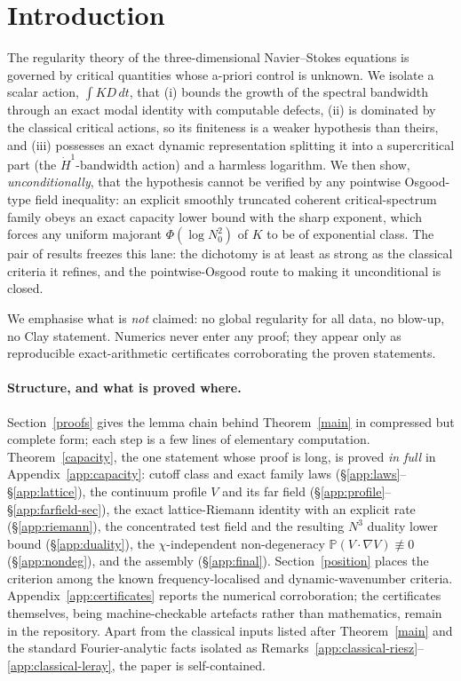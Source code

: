 \documentclass[11pt]{article}
\theoremstyle{definition}
\newcommand{\PP}{\mathbb P}
\begin{document}
\section{Introduction}

The regularity theory of the three-dimensional Navier--Stokes
equations is governed by critical quantities whose a-priori control is
unknown. We isolate a scalar action, $\int K D\,dt$, that (i) bounds
the growth of the spectral bandwidth through an exact modal identity
with computable defects, (ii) is dominated by the classical critical
actions, so its finiteness is a weaker hypothesis than theirs, and
(iii) possesses an exact dynamic representation splitting it into a
supercritical part (the $\dot H^1$-bandwidth action) and a harmless
logarithm. We then show, \emph{unconditionally}, that
the hypothesis cannot be verified by any pointwise Osgood-type field
inequality: an explicit smoothly truncated coherent critical-spectrum
family obeys an exact capacity lower bound with the sharp exponent,
which forces any uniform majorant
$\Phi(\log N_0^2)$ of $K$ to be of exponential class. The pair of
results freezes this lane: the dichotomy is at least as strong as the
classical criteria it refines, and the pointwise-Osgood route to
making it unconditional is closed.

We emphasise what is \emph{not} claimed: no global regularity for all
data, no blow-up, no Clay statement. Numerics never enter any proof;
they appear only as reproducible exact-arithmetic certificates
corroborating the proven statements.

\paragraph{Structure, and what is proved where.}
Section~\ref{proofs} gives the lemma chain behind Theorem~\ref{main} in
compressed but complete form; each step is a few lines of elementary
computation. Theorem~\ref{capacity}, the one statement whose proof is
long, is proved \emph{in full} in Appendix~\ref{app:capacity}: cutoff
class and exact family laws
(\S\ref{app:laws}--\S\ref{app:lattice}), the continuum profile $V$ and
its far field (\S\ref{app:profile}--\S\ref{app:farfield-sec}), the exact
lattice-Riemann identity with an explicit rate (\S\ref{app:riemann}),
the concentrated test field and the resulting $N^3$ duality lower bound
(\S\ref{app:duality}), the $\chi$-independent non-degeneracy
$\PP(V\cdot\nabla V)\not\equiv0$ (\S\ref{app:nondeg}), and the
assembly (\S\ref{app:final}). Section~\ref{position} places the
criterion among the known frequency-localised and dynamic-wavenumber
criteria. Appendix~\ref{app:certificates} reports the numerical
corroboration; the certificates themselves, being machine-checkable
artefacts rather than mathematics, remain in the repository. Apart from
the classical inputs listed after Theorem~\ref{main} and the standard
Fourier-analytic facts isolated as
Remarks~\ref{app:classical-riesz}--\ref{app:classical-leray}, the paper
is self-contained.
\end{document}

